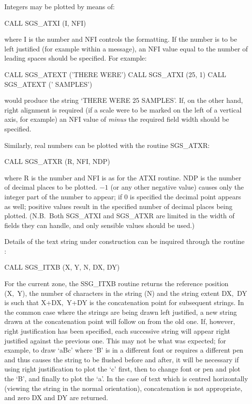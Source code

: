 \documentclass[11pt]{starlink}
\begin{document}
Integers may be plotted by means of:
\begin{terminalv}
CALL SGS_ATXI (I, NFI)
\end{terminalv}
where I is the number and NFI controls the formatting.  If the number
is to be left justified (for example within a message), an NFI value
equal to the number of leading spaces should be specified.  For
example:
\begin{terminalv}
CALL SGS_ATEXT ('THERE WERE')
CALL SGS_ATXI (25, 1)
CALL SGS_ATEXT (' SAMPLES')
\end{terminalv}
would produce the string `THERE WERE 25 SAMPLES'.  If, on
the other hand, right alignment is required (if a
scale were to be marked
on the left of a vertical axis, for example) an NFI value of \emph{minus}\/
the required field width should be specified.

Similarly, real numbers can be plotted with the routine SGS\_ATXR:
\begin{terminalv}
CALL SGS_ATXR (R, NFI, NDP)
\end{terminalv}
where R is the number and NFI is as for the ATXI routine.  NDP is
the number of decimal places to be plotted.  $-1$ (or any other negative
value) causes only the integer part of the number to appear;  if 0 is
specified the decimal point appears as well;  positive values result
in the specified number of decimal places being plotted.
(N.B.\ Both SGS\_ATXI and SGS\_ATXR are limited in the width of fields they
can handle, and only sensible values should be used.)

Details of the text string under construction can be inquired
through the routine :
\begin{terminalv}
CALL SGS_ITXB (X, Y, N, DX, DY)
\end{terminalv}
For the current zone, the SSG\_ITXB
routine returns the reference position (X,~Y),
the number of characters in the string (N) and
the string extent DX,~DY is such that X+DX,~Y+DY is the concatenation
point for subsequent strings.  In the common case where the strings
are being drawn left justified, a new string drawn at the concatenation
point will follow on from the old one.  If, however, right justification
has been specified, each successive string will appear right justified
against the previous one.  This may not be what was expected;  for
example, to draw `aBc' where `B' is in a different font or requires a
different pen and thus causes the string to be flushed before and after,
it will be necessary if using right justification to plot the `c'
first, then to change font or pen and plot the `B', and finally to plot
the `a'.  In the case of text which is centred horizontally (viewing
the string in the normal orientation), concatenation is not appropriate,
and zero DX and DY are returned.
\end{document}

